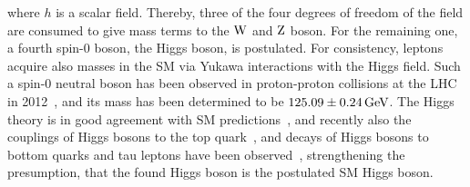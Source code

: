 where $h$ is a scalar field. Thereby, three of the four degrees of freedom of the field are consumed to give mass terms to the $\mathrm{W}$ and $\mathrm{Z}$ boson. For the remaining one, a fourth spin-0 boson, the Higgs boson, is postulated. For consistency, leptons acquire also masses in the SM via Yukawa interactions with the Higgs field.
Such a spin-0 neutral boson has been observed in proton-proton collisions at the LHC in 2012~\cite{HiggsCMS,HiggsATLAS}, and its mass has been determined to be $125.09\pm0.24\,\text{Ge\hspace{-.08em}V}$. The Higgs theory is in good agreement with SM predictions~\cite{HiggsPrecise}, and recently also the couplings of Higgs bosons to the top quark~\cite{ttH}, and decays of Higgs bosons to bottom quarks and tau leptons have been observed~\cite{HiggsTauTau,HiggsBB}, strengthening the presumption, that the found Higgs boson is the postulated SM Higgs boson.



